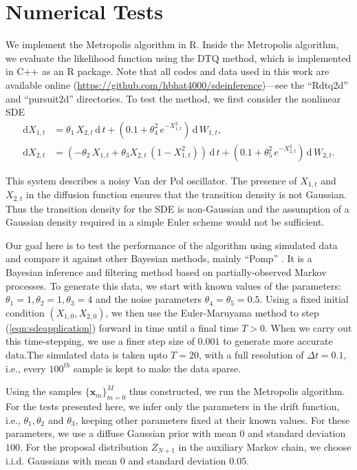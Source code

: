 \documentclass[graybox]{svmult}
\begin{document}
\section{Numerical Tests}
\label{sec:3}
We implement the Metropolis algorithm in R. Inside the Metropolis algorithm, we evaluate the likelihood function using the DTQ method, which is implemented in C++ as an R package. Note that all codes and data used in this work are available online (\url{https://github.com/hbhat4000/sdeinference})---see the ``Rdtq2d'' and ``pursuit2d'' directories.
To test the method, we first consider the nonlinear SDE
\begin{subequations}
\label{eqn:sdeapplication}
\begin{align}
\mathrm{d}X_{1,t} & =  \theta_1 \, X_{2,t} \, \mathrm{d} \, t + (0.1 + \theta_4^2 \, e^{-X_{1,t}^2}) \, \mathrm{d} \, W_{1,t}, \\
\mathrm{d}X_{2,t} & = (-\theta_2 \, X_{1,t} + \theta_3 X_{2,t} \, (1 - X_{1,t}^2)) \, \mathrm{d} \, t + (0.1 + \theta_5^2 \, e^{-X_{2,t}^2}) \, \mathrm{d} \, W_{2,t}.
\end{align}
\end{subequations}

This system describes a noisy Van der Pol oscillator. The presence of $X_{1,t}$ and $X_{2,t}$ in the diffusion function ensures that the transition density is not Gaussian. Thus the transition density for the SDE is non-Gaussian and the assumption of a Gaussian density required in a simple Euler scheme would not be sufficient.

Our goal here is to test the performance of the algorithm using simulated data and compare it against other Bayesian methods, mainly ``Pomp'' \cite{king2016statistical}. It is a Bayesian inference and filtering method based on partially-observed Markov processes. To generate this data, we start with known values of the parameters: $\theta_1 = 1, \theta_2 = 1, \theta_3 = 4$ and the noise parameters $\theta_4 =  \theta_5 = 0.5$. Using a fixed initial condition $(X_{1,0},X_{2,0})$, we then use the Euler-Maruyama method to step (\ref{eqn:sdeapplication}) forward in time until a final time $T > 0$. When we carry out this time-stepping, we use a finer step size of $0.001$ to generate more accurate data.The simulated data is taken upto $T = 20$, with a full resolution of $\Delta t = 0.1$, i.e., every $100^{th}$ sample is kept to make the data sparse.

Using the samples $\{ \mathbf{x}_m \}_{m=0}^M$ thus constructed, we run the Metropolis algorithm. For the tests presented here, we infer only the parameters in the drift function, i.e., $\theta_1, \theta_2$ and $\theta_3$, keeping other parameters fixed at their known values. For these parameters, we use a diffuse Gaussian prior with mean $0$ and standard deviation $100$. For the proposal distribution $Z_{N+1}$ in the auxiliary Markov chain, we choose i.i.d. Gaussians with mean $0$ and standard deviation $0.05$.
\end{document}
